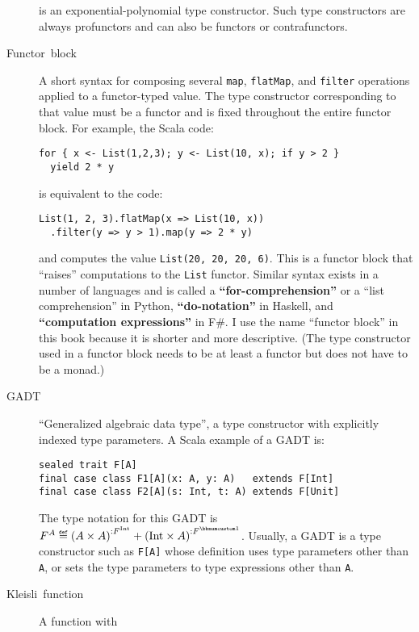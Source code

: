 \begin{description}
is an exponential-polynomial type constructor. Such type constructors
are always profunctors and can also be functors or contrafunctors.
\item [{\index{functor block}Functor~block}] A short syntax for composing
several \lstinline!map!, \lstinline!flatMap!, and \lstinline!filter!
operations applied to a functor-typed value. The type constructor
corresponding to that value must be a functor and is fixed throughout
the entire functor block. For example, the Scala code:
\begin{lstlisting}
for { x <- List(1,2,3); y <- List(10, x); if y > 2 }
  yield 2 * y
\end{lstlisting}
is equivalent to the code:
\begin{lstlisting}
List(1, 2, 3).flatMap(x => List(10, x))
  .filter(y => y > 1).map(y => 2 * y)
\end{lstlisting}
and computes the value \lstinline!List(20, 20, 20, 6)!. This is a
functor block that \textsf{``}raises\textsf{''} computations to the \lstinline!List!
functor. Similar syntax exists in a number of languages and is called
a \textbf{\textsf{``}for-comprehension\textsf{''}}
or a \textsf{``}list comprehension\textsf{''} in Python, \textbf{\textsf{``}do-notation\textsf{''}}
in Haskell, and \textbf{\textsf{``}computation expressions\textsf{''}}
in F\#. I use the name \textsf{``}functor block\textsf{''} in this book because it
is shorter and more descriptive. (The type constructor used in a functor
block needs to be at least a functor but does not have to be a monad.)
\item [{\index{GADT}GADT}] \textsf{``}Generalized algebraic data type\textsf{''}, a type
constructor with explicitly indexed type parameters. A Scala example
of a GADT is:
\begin{lstlisting}
sealed trait F[A]
final case class F1[A](x: A, y: A)   extends F[Int]
final case class F2[A](s: Int, t: A) extends F[Unit]
\end{lstlisting}
The type notation for this GADT is $F^{A}\triangleq\left(A\times A\right)^{:F^{\text{Int}}}+\left(\text{Int}\times A\right)^{:F^{\bbnum 1}}$.
Usually, a GADT is a type constructor such as \lstinline!F[A]! whose
definition uses type parameters other than \lstinline!A!, or sets
the type parameters to type expressions other than \lstinline!A!.
\item [{Kleisli~function}]  A function with

\end{description}

